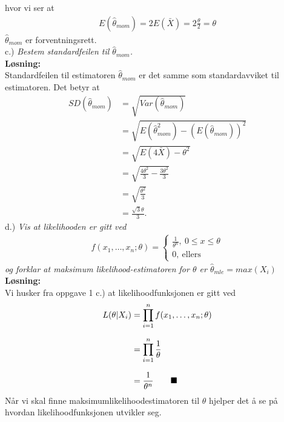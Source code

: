 \documentclass[12pt,
               a4paper,
               article,
               oneside,
               oldfontcommands,
               norsk]{memoir}
\newcommand{\Q}{ \qquad \hfill \blacksquare}
\begin{document}
hvor vi ser at
\begin{align*}
    E(\hat{\theta}_{mom}) = 2 E(\bar{X}) = 2 \frac{\theta}{2} = \theta
\end{align*}
$\hat{\theta}_{mom}$ er forventningsrett. \vspace{4mm}\\
c.)  \emph{Bestem standardfeilen til $\hat{\theta}_{mom}$.}
\vspace{3mm}\\
\textbf{Løsning:}\vspace{3mm}\\
Standardfeilen til estimatoren $\hat{\theta}_{mom}$ er det samme som standardavviket til estimatoren. Det betyr at
\begin{align*}
    SD(\hat{\theta}_{mom}) &= \sqrt{Var(\hat{\theta}_{mom})} \\[7pt]
    &= \sqrt{E(\hat{\theta}_{mom}^2) - (E(\hat{\theta}_{mom}))^2}\\[7pt]
    &= \sqrt{E(4 \bar{X}) - \theta^2} \\[7pt]
    &= \sqrt{\frac{4\theta^2}{3} - \frac{3 \theta^2}{3}} \\[7pt]
    &= \sqrt{\frac{\theta^2}{3}} \\[7pt]
    &= \frac{\sqrt{3}\theta}{3}.
\end{align*}
d.) \emph{Vis at likelihooden er gitt ved}
\begin{align*}
    f(x_1, \ldots, x_n; \theta) =
    \begin{cases}
    \frac{1}{\theta^n}, \ 0 \leq x \leq \theta \\[4pt]
    0 , \ \text{ellers}
    \end{cases}
\end{align*}
\emph{og forklar at maksimum likelihood-estimatoren for $\theta$ er $\hat{\theta}_{mle} = max(X_i)$}
\vspace{3mm}\\
\textbf{Løsning:}\vspace{3mm}\\
Vi husker fra oppgave 1 c.) at likelihoodfunksjonen er gitt ved
\begin{align*}
    L(\theta | X_i) &= \prod_{i=1}^{n} f(x_1, \ldots, x_n; \theta) \\[7pt]
    &= \prod_{i=1}^{n} \frac{1}{\theta} \\[7pt]
    &= \frac{1}{\theta^n} \Q
\end{align*}
Når vi skal finne maksimumlikelihoodestimatoren til $\theta$ hjelper det å se på hvordan likelihoodfunksjonen utvikler seg.
\end{document}
